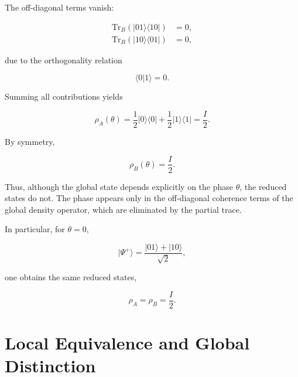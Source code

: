 The off-diagonal terms vanish:

\begin{align}
\mathrm{Tr}_B
\left(
|01\rangle\langle 10|
\right)
&=
0,
\nonumber
\\
\mathrm{Tr}_B
\left(
|10\rangle\langle 01|
\right)
&=
0,
\label{eq:appendix_partial_trace_offdiagonal}
\end{align}

due to the orthogonality relation

\[
\langle 0|1\rangle = 0.
\]

Summing all contributions yields

\begin{equation}
\rho_A(\theta)
=
\frac{1}{2}
|0\rangle\langle 0|
+
\frac{1}{2}
|1\rangle\langle 1|
=
\frac{I}{2}.
\label{eq:appendix_reduced_density_A}
\end{equation}

By symmetry,

\begin{equation}
\rho_B(\theta)
=
\frac{I}{2}.
\label{eq:appendix_reduced_density_B}
\end{equation}

Thus, although the global state depends explicitly on the phase \( \theta \), the reduced states do not. The phase appears only in the off-diagonal coherence terms of the global density operator, which are eliminated by the partial trace.

\medskip

In particular, for \( \theta = 0 \),

\begin{equation}
|\Psi^+\rangle
=
\frac{
|01\rangle
+
|10\rangle
}{
\sqrt{2}
},
\label{eq:appendix_standard_bell_state}
\end{equation}

one obtains the same reduced states,

\begin{equation}
\rho_A
=
\rho_B
=
\frac{I}{2}.
\label{eq:appendix_standard_bell_reduced}
\end{equation}


\section*{Local Equivalence and Global Distinction}

